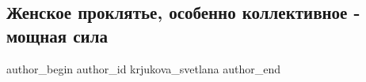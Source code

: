  
 
 
 
 
 
\subsection{Женское проклятье, особенно коллективное - мощная сила}
\label{sec:08_03_2022.fb.krjukova_svetlana.1.zhenskoje_prokljatie}
 
\ifcmt
 author_begin
   author_id krjukova_svetlana
 author_end
\fi

